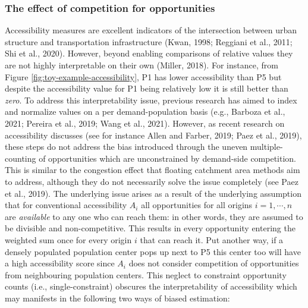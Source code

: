 \documentclass[]{elsarticle} %
\begin{document}
\hypertarget{the-effect-of-competition-for-opportunities}{%
\subsubsection{The effect of competition for
opportunities}\label{the-effect-of-competition-for-opportunities}}

Accessibility measures are excellent indicators of the intersection
between urban structure and transportation infrastructure (Kwan, 1998;
Reggiani et al., 2011; Shi et al., 2020). However, beyond enabling
comparisons of relative values they are not highly interpretable on
their own (Miller, 2018). For instance, from Figure
\ref{fig:toy-example-accessibility}, P1 has lower accessibility than P5
but despite the accessibility value for P1 being relatively low it is
still better than \emph{zero}. To address this interpretability issue,
previous research has aimed to index and normalize values on a per
demand-population basis (e.g., Barboza et al., 2021; Pereira et al.,
2019; Wang et al., 2021). However, as recent research on accessibility
discusses (see for instance Allen and Farber, 2019; Paez et al., 2019),
these steps do not address the bias introduced through the uneven
multiple-counting of opportunities which are unconstrained by
demand-side competition. This is similar to the congestion effect that
floating catchment area methods aim to address, although they do not
necessarily solve the issue completely (see Paez et al., 2019). The
underlying issue arises as a result of the underlying assumption that
for conventional accessibility \(A_i\) all opportunities for all origins
\(i=1,\cdots,n\) are \emph{available} to any one who can reach them: in
other words, they are assumed to be divisible and non-competitive. This
results in every opportunity entering the weighted sum once for every
origin \(i\) that can reach it. Put another way, if a densely populated
population center pops up next to P5 this center too will have a high
accessibility score since \(A_i\) does not consider competition of
opportunities from neighbouring population centers. This neglect to
constraint opportunity counts (i.e., single-constraint) obscures the
interpretability of accessibility which may manifests in the following
two ways of biased estimation:
\end{document}
